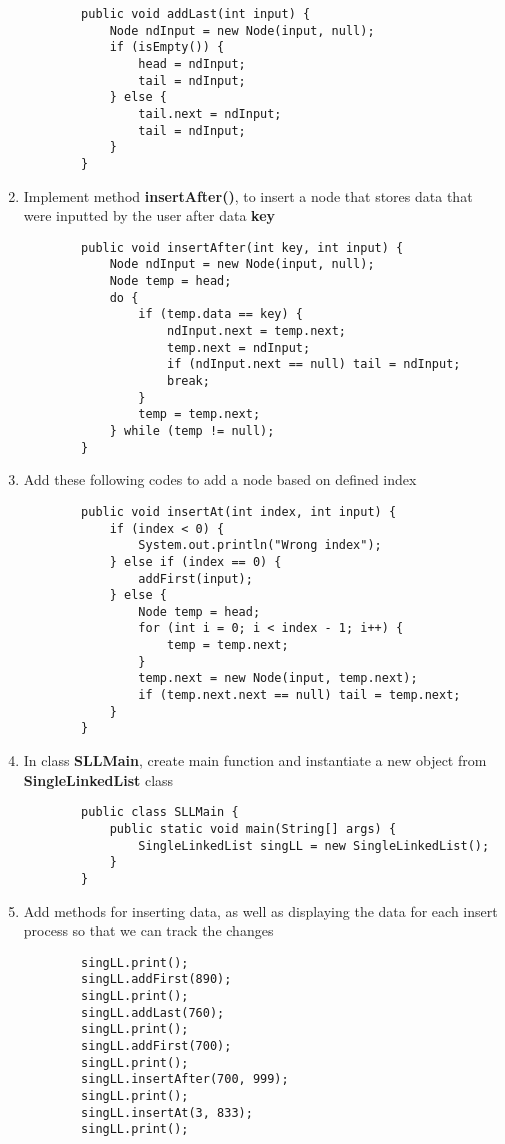 \documentclass[12pt,titlepage]{article}
\begin{document}
\begin{enumerate}
\begin{verbatim}
        public void addLast(int input) {
            Node ndInput = new Node(input, null);
            if (isEmpty()) {
                head = ndInput;
                tail = ndInput;
            } else {
                tail.next = ndInput;
                tail = ndInput;
            }
        }
    \end{verbatim}
    \item Implement method \textbf{insertAfter()}, to insert a node that stores data that were inputted by the user after data \textbf{key}
    \begin{verbatim}
        public void insertAfter(int key, int input) {
            Node ndInput = new Node(input, null);
            Node temp = head;
            do {
                if (temp.data == key) {
                    ndInput.next = temp.next;
                    temp.next = ndInput;
                    if (ndInput.next == null) tail = ndInput;
                    break;
                }
                temp = temp.next;
            } while (temp != null);
        }
    \end{verbatim}
    \item Add these following codes to add a node based on defined index
    \begin{verbatim}
        public void insertAt(int index, int input) {
            if (index < 0) {
                System.out.println("Wrong index");
            } else if (index == 0) {
                addFirst(input);
            } else {
                Node temp = head;
                for (int i = 0; i < index - 1; i++) {
                    temp = temp.next;
                }
                temp.next = new Node(input, temp.next);
                if (temp.next.next == null) tail = temp.next;
            }
        }
    \end{verbatim}
    \item In class \textbf{SLLMain}, create main function and instantiate a new object from \textbf{SingleLinkedList} class
    \begin{verbatim}
        public class SLLMain {
            public static void main(String[] args) {
                SingleLinkedList singLL = new SingleLinkedList();
            }
        }
    \end{verbatim}
    \item Add methods for inserting data, as well as displaying the data for each insert process so that we can track the changes
    \begin{verbatim}
        singLL.print();
        singLL.addFirst(890);
        singLL.print();
        singLL.addLast(760);
        singLL.print();
        singLL.addFirst(700);
        singLL.print();
        singLL.insertAfter(700, 999);
        singLL.print();
        singLL.insertAt(3, 833);
        singLL.print();
    \end{verbatim}
\end{enumerate}
\end{document}
